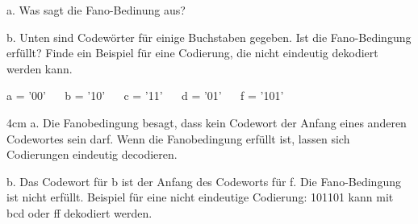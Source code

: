 \question[2]

a. Was sagt die Fano-Bedinung aus?

b. Unten sind Codewörter für einige Buchstaben gegeben. 
Ist die Fano-Bedingung erfüllt? Finde ein Beispiel für eine Codierung, die nicht eindeutig dekodiert werden kann.

a = '00' ~~ b = '10' ~~ c = '11' ~~ d = '01' ~~ f = '101'
 
\begin{solutionbox}{4cm}
a. Die Fanobedingung besagt, dass kein Codewort der Anfang eines anderen Codewortes sein darf. Wenn die Fanobedingung erfüllt ist, lassen sich Codierungen eindeutig decodieren.
 
b. Das Codewort für b ist der Anfang des Codeworts für f. Die Fano-Bedingung ist nicht erfüllt.
Beispiel für eine nicht eindeutige Codierung: 101101 kann mit bcd oder ff dekodiert werden.
\end{solutionbox}